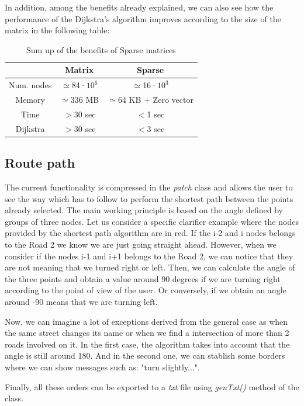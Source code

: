 \documentclass{article}
\begin{document}
In addition, among the benefits already explained, we can also see how the performance of the Dijkstra's algorithm improves according to the size of the matrix in the following table:

\begin{table}[ht] 
\caption{Sum up of the benefits of Sparse matrices} 
\centering
\begin{tabular}{c c c}
\hline\hline 
~ & Matrix & Sparse \\ [0.5ex]  
\hline 
Num. nodes & $\simeq$84·$10^{6}$ & $\simeq$16·$10^{3}$ \\
Memory & $\simeq$336 MB & $\simeq$64 KB + Zero vector\\ 
Time & $>$30 sec & $<$1 sec \\ 
Dijkstra &  $>$30 sec & $<$3 sec \\ [1ex]
\hline
\end{tabular} 
\label{table:nonlin}
\end{table} 

\subsection{Route path}

The current functionality is compressed in the \textit{patch} class and allows the user to see the way which has to follow to perform the shortest path between the points already selected.
The main working principle is based on the angle defined by groups of three nodes. Let us consider a specific clarifier example where the nodes provided by the shortest path algorithm are in red. If the i-2 and i nodes belongs to the Road 2 we know we are just going straight ahead. However, when we consider if the nodes i-1 and i+1 belongs to the Road 2, we can notice that they are not meaning that we turned right or left. Then, we can calculate the angle of the three points and obtain a value around 90 degrees if we are turning right according to the point of view of the user. Or conversely, if we obtain an angle around -90 means that we are turning left.

Now, we can imagine a lot of exceptions derived from the general case as when the same street changes its name or when we find a intersection of more than 2 roads involved on it. In the first case, the algorithm takes into account that the angle is still around 180. And in the second one, we can stablish some borders where we can show messages such as: "turn slightly...".

Finally, all these orders can be exported to a \textit{txt} file using \textit{genTxt()} method of the class.
\end{document}
